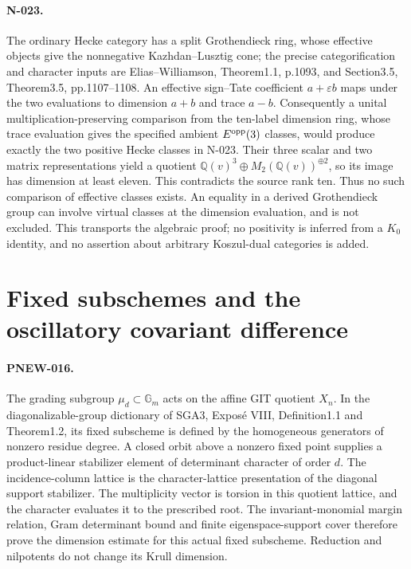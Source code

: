 \paragraph{N-023.}
The ordinary Hecke category has a split Grothendieck ring, whose
effective objects give the nonnegative Kazhdan--Lusztig cone; the
precise categorification and character inputs are Elias--Williamson,
Theorem1.1, p.1093, and Section3.5, Theorem3.5, pp.1107--1108.
An effective sign--Tate coefficient $a+\varepsilon b$ maps under
the two evaluations to dimension $a+b$ and trace $a-b$. Consequently
a unital multiplication-preserving comparison from the ten-label
dimension ring, whose trace evaluation gives the specified ambient
$E^{\rm opp}(3)$ classes, would produce exactly the two positive
Hecke classes in N-023.
Their three scalar and two matrix representations yield a quotient
$\mathbb Q(v)^3\oplus M_2(\mathbb Q(v))^{\oplus2}$, so its image
has dimension at least eleven. This contradicts the source rank ten.
Thus no such comparison of effective classes exists. An equality in
a derived Grothendieck group can involve virtual classes at the
dimension evaluation, and is not excluded. This transports the
algebraic proof; no positivity is inferred from a $K_0$ identity,
and no assertion about arbitrary Koszul-dual categories is added.

\section{Fixed subschemes and the oscillatory covariant difference}
\paragraph{PNEW-016.}
The grading subgroup $\mu_d\subset\mathbb G_m$ acts on the affine
GIT quotient $X_n$. In the diagonalizable-group dictionary of SGA3,
Expos\'e VIII, Definition1.1 and Theorem1.2, its fixed subscheme is
defined by the homogeneous generators of nonzero residue degree.
A closed orbit above a nonzero fixed point supplies a product-linear
stabilizer element of determinant character of order $d$. The
incidence-column lattice is the character-lattice presentation of
the diagonal support stabilizer. The multiplicity vector is torsion
in this quotient lattice, and the character evaluates it to the
prescribed root. The invariant-monomial margin relation, Gram
determinant bound and finite eigenspace-support cover therefore prove
the dimension estimate for this actual fixed subscheme. Reduction
and nilpotents do not change its Krull dimension.

